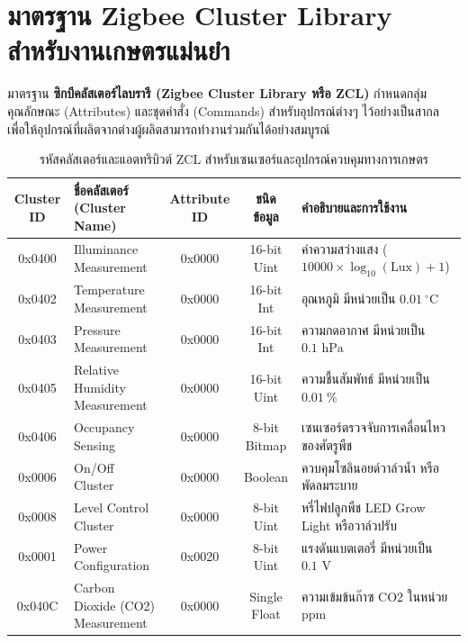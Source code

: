 \chapter{มาตรฐาน Zigbee Cluster Library สำหรับงานเกษตรแม่นยำ}
\label{app:zcl_standard}

มาตรฐาน \textbf{ซิกบีคลัสเตอร์ไลบรารี (Zigbee Cluster Library หรือ ZCL)} กำหนดกลุ่มคุณลักษณะ (Attributes) และชุดคำสั่ง (Commands) สำหรับอุปกรณ์ต่างๆ ไว้อย่างเป็นสากล เพื่อให้อุปกรณ์ที่ผลิตจากต่างผู้ผลิตสามารถทำงานร่วมกันได้อย่างสมบูรณ์

\begin{table}[H]
\caption{รหัสคลัสเตอร์และแอตทริบิวต์ ZCL สำหรับเซนเซอร์และอุปกรณ์ควบคุมทางการเกษตร}
\label{tab:zcl_clusters_agri}
\centering
\small
\begin{tabularx}{\textwidth}{c p{4.2cm} c c >{\raggedright\arraybackslash}X}
\toprule
\textbf{Cluster ID} & \textbf{ชื่อคลัสเตอร์ (Cluster Name)} & \textbf{Attribute ID} & \textbf{ชนิดข้อมูล} & \textbf{คำอธิบายและการใช้งาน} \\
\midrule
0x0400 & Illuminance Measurement & 0x0000 & 16-bit Uint & ค่าความสว่างแสง ($10000 \times \log_{10}(\text{Lux}) + 1$) \\
0x0402 & Temperature Measurement & 0x0000 & 16-bit Int & อุณหภูมิ มีหน่วยเป็น $0.01\ ^\circ\text{C}$ \\
0x0403 & Pressure Measurement & 0x0000 & 16-bit Int & ความกดอากาศ มีหน่วยเป็น $0.1\text{ hPa}$ \\
0x0405 & Relative Humidity Measurement & 0x0000 & 16-bit Uint & ความชื้นสัมพัทธ์ มีหน่วยเป็น $0.01\ \%$ \\
0x0406 & Occupancy Sensing & 0x0000 & 8-bit Bitmap & เซนเซอร์ตรวจจับการเคลื่อนไหวของศัตรูพืช \\
0x0006 & On/Off Cluster & 0x0000 & Boolean & ควบคุมโซลินอยด์วาล์วน้ำ หรือพัดลมระบาย \\
0x0008 & Level Control Cluster & 0x0000 & 8-bit Uint & หรี่ไฟปลูกพืช LED Grow Light หรือวาล์วปรับ \\
0x0001 & Power Configuration & 0x0020 & 8-bit Uint & แรงดันแบตเตอรี่ มีหน่วยเป็น $0.1\text{ V}$ \\
0x040C & Carbon Dioxide (CO2) Measurement & 0x0000 & Single Float & ความเข้มข้นก๊าซ CO2 ในหน่วย ppm \\
\bottomrule
\end{tabularx}
\end{table}

\clearpage
